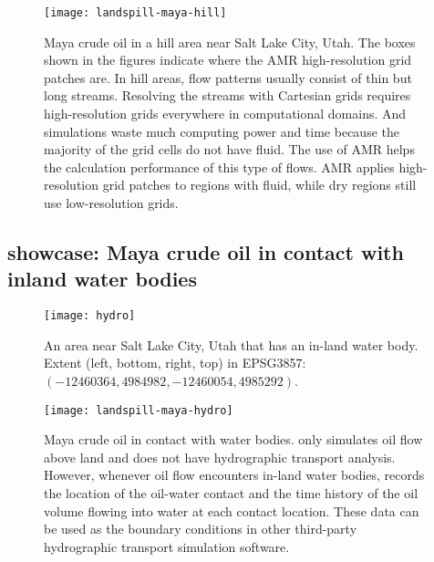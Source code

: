 \begin{figure*}
    \texttt{[image: landspill-maya-hill]}
    \caption{%
        Maya crude oil in a hill area near Salt Lake City, Utah. %
        The boxes shown in the figures indicate where the AMR high-resolution grid patches are. %
        In hill areas, flow patterns usually consist of thin but long streams. %
        Resolving the streams with Cartesian grids requires high-resolution grids everywhere in computational domains. %
        And simulations waste much computing power and time because the majority of the grid cells do not have fluid. %
        The use of AMR helps the calculation performance of this type of flows. %
        AMR applies high-resolution grid patches to regions with fluid, while dry regions still use low-resolution grids.%
    }
    \label{fig:landspill-maya-hill}
\end{figure*}

\subsection{showcase: Maya crude oil in contact with inland water bodies}

\begin{figure}
    \centering
    \texttt{[image: hydro]}
    \caption{%
        An area near Salt Lake City, Utah that has an in-land water body. %
        Extent (left, bottom, right, top) in EPSG3857: $(-12460364, 4984982, -12460054, 4985292)$.
    }
    \label{fig:hydro-terrain-satellite}
\end{figure}

\begin{figure*}
    \texttt{[image: landspill-maya-hydro]}
    \caption{%
        Maya crude oil in contact with water bodies. %
        \geoclawlandspill only simulates oil flow above land and does not have hydrographic transport analysis. %
        However, whenever oil flow encounters in-land water bodies, \geoclawlandspill records the location of the oil-water contact and the time history of the oil volume flowing into water at each contact location.  %
        These data can be used as the boundary conditions in other third-party hydrographic transport simulation software.%
    }
    \label{fig:landspill-maya-hydro}
\end{figure*}
